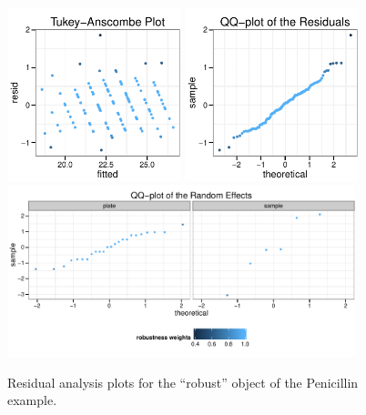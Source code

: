 \documentclass[11pt, a4paper]{article}
\theoremstyle{note}
\begin{document}
\begin{figure}[htbp]
  \centering
  \includegraphics[width=0.45\textwidth]{figs/fig-ex-penicillin-ta}
  \includegraphics[width=0.45\textwidth]{figs/fig-ex-penicillin-qq-resid}
  \includegraphics[width=0.9\textwidth]{figs/fig-ex-penicillin-qq-ranef}
  \caption{Residual analysis plots for the ``robust'' object of the
    Penicillin example.}
  \label{fig:penicillinResidualAnalysis}
\end{figure}
\end{document}
